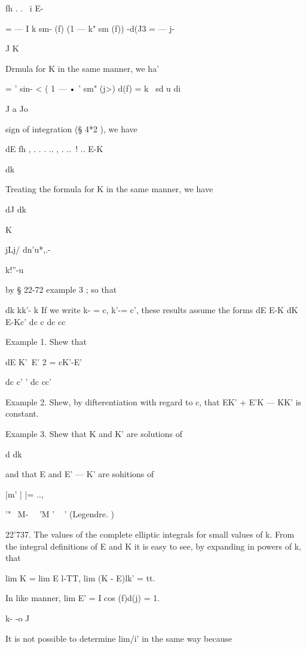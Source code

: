 fh . . \ i E-

= — I k sm- (f) (1 — k" sm (f)) -d(J3 = — j-

J K

Drmula for K in the same manner, we ha'

= ' sin- < ( 1 — • ' sm" (j>) d(f) = k \ sd u di

J a Jo



sign of integration (§ 4*2 ), we have

dE fh , . . . .. , . ..\ ! .. E-K

dk

Treating the formula for K in the same manner, we have

dJ dk

K



jLj/ dn'u*,.-



k!''-u



by § 22-72 example 3 ; so that

dk kk'- k If we write k- = c, k'-= c', these results assume the forms
dE E-K dK E-Kc' dc c dc cc

Example 1. Shew that

 dE K'~E' 2 = cK'-E'

dc c' ' dc cc'

Example 2. Shew, by difterentiation with regard to c, that EK' + E'K —
KK' is constant.



Example 3. Shew that K and K' are solutions of

d dk

and that E and E' — K' are sohitions of



|m' | |= ..,



 '" ~M- \ \ 'M ' ~ ' (Legendre. )



22'737. The values of the complete elliptic integrals for small values
of k. From the integral definitions of E and K it is easy to see, by
expanding in powers of k, that

lim K = lim E l-TT, lim (K - E)lk' = tt.

In like manner, lim E' = I cos (f)d(j) = 1.

k- -o J

It is not possible to determine lim/i' in the same way because

